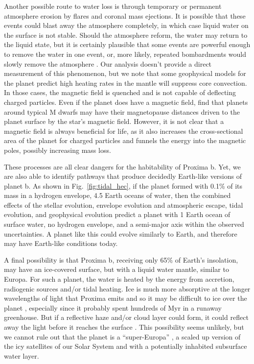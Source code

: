 \documentclass[preprint,12pt]{aastex}
\def\eg{{\it e.g.\ }}
\begin{document}
Another possible route to water loss is through temporary or permanent
atmosphere erosion by flares and coronal mass ejections. It is
possible that these events could blast away the atmosphere completely,
in which case liquid water on the surface is not stable. Should the
atmosphere reform, the water may return to the liquid state, but it is
certainly plausible that some events are powerful enough to remove the
water in one event, or, more likely, repeated bombardments would
slowly remove the atmosphere \citep{Cohen15}.  Our analysis doesn't
provide a direct measurement of this phenomenon, but we note that some
geophysical models for the planet predict high heating rates in the
mantle will suppress core convection. In those cases, the magnetic
field is quenched and is not capable of deflecting charged
particles. Even if the planet does have a magnetic field,
\cite{Vidotto13} find that planets around typical M dwarfs may have
their magnetopause distances driven to the planet surface by the
star's magnetic field. However, it is not clear that a magnetic field
is always beneficial for life, as it also increases the
cross-sectional area of the planet for charged particles and funnels
the energy into the magnetic poles, possibly increasing mass loss.

These processes are all clear dangers for the habitability of Proxima
b. Yet, we are also able to identify pathways that produce decidedly
Earth-like versions of planet b. As shown in Fig.~\ref{fig:tidal_hec},
if the planet formed with 0.1\% of its mass in a hydrogen envelope, 4.5
Earth oceans of water, then the combined effects of the stellar
evolution, envelope evolution and atmospheric escape, tidal evolution,
and geophysical evolution predict a planet with 1 Earth ocean of
surface water, no hydrogen envelope, and a semi-major axis within the
observed uncertainties. A planet like this could evolve similarly to
Earth, and therefore may have Earth-like conditions today.

A final possibility is that Proxima b, receiving only 65\% of Earth's
insolation, may have an ice-covered surface, but with a liquid water
mantle, similar to Europa. For such a planet, the water is heated by
the energy from accretion, radiogenic sources and/or tidal
heating. Ice is much more absorptive at the longer wavelengths of
light that Proxima emits and so it may be difficult to ice over the
planet \citep{JoshiHaberle12,Shields13}, especially since it probably
spent hundreds of Myr in a runaway greenhouse. But if a reflective
haze and/or cloud layer could form, it could reflect away the light
before it reaches the surface \citep[\eg][]{Arney16}. This possibility
seems unlikely, but we cannot rule out that the planet is a
``super-Europa'' \citep{BarnesHeller13}, a scaled up version of the
icy satellites of our Solar System and with a potentially inhabited
subsurface water layer.
\end{document}
